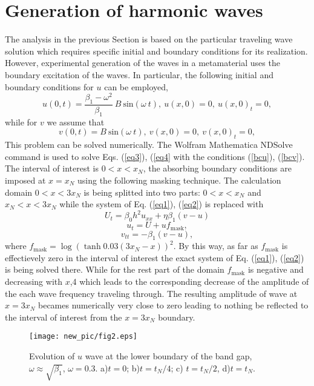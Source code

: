 \section{Generation of harmonic waves}
The analysis in the previous Section is based on the particular traveling wave solution which requires specific initial and boundary conditions for its realization. However, experimental generation of the waves in a metamaterial uses the boundary excitation of the waves. In particular, the following  initial and boundary conditions for $u$ can be employed,
\begin{equation}\label{bcu}
u(0,t)=\frac{\beta_1-\omega^2}{\beta_1}~B~ {\text{sin}} (\omega ~t),~u(x,0)=0, ~u(x,0)_t=0,
\end{equation}
while for $v$ we assume that
\begin{equation}\label{bcv}
v(0,t)=B ~{\text{sin}} (\omega ~t),~v(x,0)=0, ~v(x,0)_t=0,
\end{equation}
This problem can be solved numerically. The Wolfram Mathematica NDSolve command is used to solve Eqs. (\ref{eq3}), (\ref{eq4} with the conditions (\ref{bcu}), (\ref{bcv}). 
The interval of interest is $0<x<x_N$, 
 the absorbing boundary conditions %
are imposed at $x=x_N$%
 using the following masking technique. The calculation domain $0 < x < 3 x_N$ is being splitted into two parts:  $0 < x < x_N$ and  $x_N < x < 3 x_N$ while the system of Eq.  (\ref{eq1}), (\ref{eq2}) is replaced with
$$
U_{t}=\beta_0 h^2 u_{xx}+\eta \beta_1 (v-u)
$$
$$
u_{t}=U + u f_{\text{mask}},
$$
$$
v_{tt}=-\beta_1 (v-u),
$$
where $f_{\text{mask}} = \log \left(\tanh{0.03 (3 x_N - x)}\right)^2$. By this way, as far as $f_{\text{mask}}$ is effectievely zero in the interval of interest the exact system of Eq.  (\ref{eq1}), (\ref{eq2}) is being solved there. While for the rest part of the domain $f_{\text{mask}}$ is negative and decreasing with $x$,4 which leads to the corresponding decrease of the amplitude of the each wave frequency traveling through. The resulting amplitude of wave at $x = 3 x_N$ becames numerically very close to zero leading to nothing be reflected to the interval of interest from the $x = 3 x_N$ boundary.
\begin{figure*}
\begin{center}
\texttt{[image: new\_pic/fig2.eps]}
\end{center}
\caption{ Evolution of $u$ wave at the lower boundary of the band gap, $\omega \approx \sqrt{\beta_1}$,  $\omega=0.3$.  a)$t=0$; b)$ t=t_N/4$; c) $t=t_N/2$, d)$t=t_N$.}
\label{fg2}
  \end{figure*}



